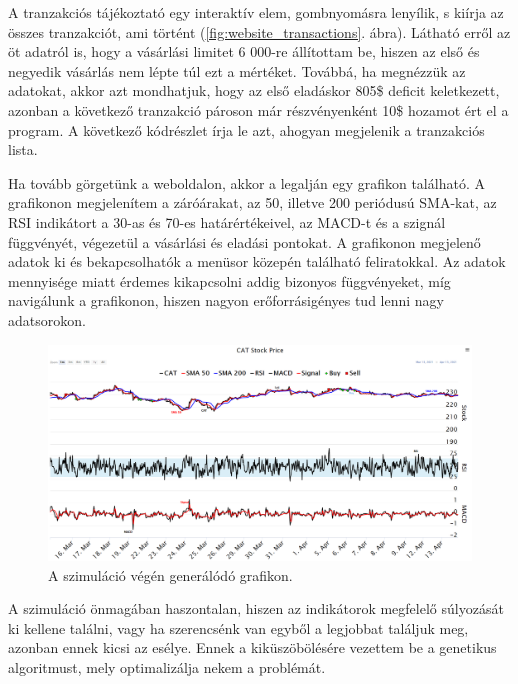 A tranzakciós tájékoztató egy interaktív elem, gombnyomásra lenyílik, s kiírja az összes tranzakciót, ami történt (\ref{fig:website_transactions}. ábra).
Látható erről az öt adatról is, hogy a vásárlási limitet 6 000-re állítottam be, hiszen az első és negyedik vásárlás nem lépte túl ezt a mértéket. Továbbá, ha megnézzük az adatokat, akkor azt mondhatjuk, hogy az első eladáskor 805\$ deficit keletkezett, azonban a következő tranzakció pároson már részvényenként 10\$ hozamot ért el a program. A következő kódrészlet írja le azt, ahogyan megjelenik a tranzakciós lista.

Ha tovább görgetünk a weboldalon, akkor a legalján egy grafikon található. A grafikonon megjelenítem a záróárakat, az 50, illetve 200 periódusú SMA-kat, az RSI indikátort a 30-as és 70-es határértékeivel, az MACD-t és a szignál függvényét, végezetül a vásárlási és eladási pontokat. A grafikonon megjelenő adatok ki és bekapcsolhatók a menüsor közepén található feliratokkal. Az adatok mennyisége miatt érdemes kikapcsolni addig bizonyos függvényeket, míg navigálunk a grafikonon, hiszen nagyon erőforrásigényes tud lenni nagy adatsorokon.
\begin{figure}[ht]
\centering
\includegraphics[width=\textwidth]{images/website_chart.png}
\caption{A szimuláció végén generálódó grafikon.}
\label{fig:website_chart}
\end{figure}
\newpage
{}
A szimuláció önmagában haszontalan, hiszen az indikátorok megfelelő súlyozását ki kellene találni, vagy ha szerencsénk van egyből a legjobbat találjuk meg, azonban ennek kicsi az esélye. Ennek a kiküszöbölésére vezettem be a genetikus algoritmust, mely optimalizálja nekem a problémát.


